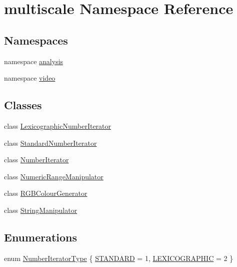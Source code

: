 \hypertarget{namespacemultiscale}{\section{multiscale Namespace Reference}
\label{namespacemultiscale}
}
\subsection*{Namespaces}
\begin{DoxyCompactItemize}
\item 
namespace \hyperlink{namespacemultiscale_1_1analysis}{analysis}
\item 
namespace \hyperlink{namespacemultiscale_1_1video}{video}
\end{DoxyCompactItemize}
\subsection*{Classes}
\begin{DoxyCompactItemize}
\item 
class \hyperlink{classmultiscale_1_1LexicographicNumberIterator}{Lexicographic\-Number\-Iterator}
\item 
class \hyperlink{classmultiscale_1_1StandardNumberIterator}{Standard\-Number\-Iterator}
\item 
class \hyperlink{classmultiscale_1_1NumberIterator}{Number\-Iterator}
\item 
class \hyperlink{classmultiscale_1_1NumericRangeManipulator}{Numeric\-Range\-Manipulator}
\item 
class \hyperlink{classmultiscale_1_1RGBColourGenerator}{R\-G\-B\-Colour\-Generator}
\item 
class \hyperlink{classmultiscale_1_1StringManipulator}{String\-Manipulator}
\end{DoxyCompactItemize}
\subsection*{Enumerations}
\begin{DoxyCompactItemize}
\item 
enum \hyperlink{namespacemultiscale_a6ef911f4d48a4bf5e657c237ec169ff5}{Number\-Iterator\-Type} \{ \hyperlink{namespacemultiscale_a6ef911f4d48a4bf5e657c237ec169ff5aa048887eb0360a4b70dff5452133f42e}{S\-T\-A\-N\-D\-A\-R\-D} = 1, 
\hyperlink{namespacemultiscale_a6ef911f4d48a4bf5e657c237ec169ff5a2cba3a0174cc5c1d555ee13dcf6cda15}{L\-E\-X\-I\-C\-O\-G\-R\-A\-P\-H\-I\-C} = 2
 \}
\end{DoxyCompactItemize}


